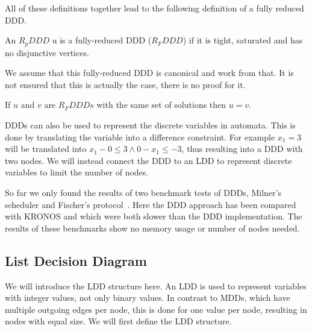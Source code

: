 All of these definitions together lead to the following definition of a fully reduced DDD.
 
\begin{mydef}
\label{def:RFDDD}
An $R_pDDD$ u is a fully-reduced DDD ($R_FDDD$) if it is tight, saturated and has no disjunctive vertices.
\end{mydef}

We assume that this fully-reduced DDD is canonical and work from that. It is not ensured that this is actually the case, there is no proof for it.

\begin{myconjecture}
\label{def:Canonical-ddd}
If $u$ and $v$ are $R_FDDDs$ with the same set of solutions then $u = v$.
\end{myconjecture}


DDDs can also be used to represent the discrete variables in automata. This is done by translating the variable into a difference constraint. For example $x_1 = 3$ will be translated into $x_1 - 0 \leq 3 \wedge 0 - x_1 \leq -3$, thus resulting into a DDD with two nodes. We will instead connect the DDD to an LDD to represent discrete variables to limit the number of nodes.

So far we only found the results of two benchmark tests of DDDs, Milner's scheduler and Fischer's protocol~\cite{Møller200253}. Here the DDD approach has been compared with KRONOS and \uppaal{} which were both slower than the DDD implementation. The results of these benchmarks show no memory usage or number of nodes needed.

\subsection{List Decision Diagram}
We will introduce the LDD structure here. An LDD is used to represent variables with integer values, not only binary values. In contrast to MDDs\cite{129849}, which have multiple outgoing edges per node, this is done for one value per node, resulting in nodes with equal size. We will first define the LDD structure.

